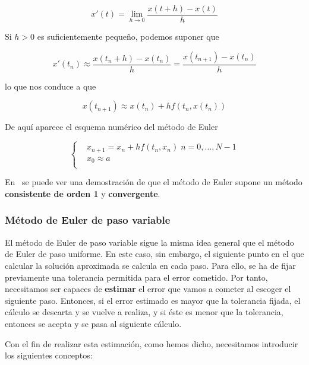 \begin{equation}
		x'(t) = \lim_{h \to 0} \frac{x(t+h) - x(t)}{h} 	
\end{equation}

Si $h>0$ es suficientemente pequeño, podemos suponer que

\begin{equation}
		x'(t_n)\approx \frac{x(t_n+h) - x(t_n)}{h} = \frac{x(t_{n+1}) -
		x(t_n)}{h}	
\end{equation}

lo que nos conduce a que

\begin{equation}
		x(t_{n+1}) \approx x(t_n) + hf(t_n,x(t_n))	
\end{equation}

De aquí aparece el esquema numérico del método de Euler

\begin{equation}
		\left\{ \begin{aligned}
				& x_{n+1} = x_n + hf(t_n,x_n) \; n=0,\ldots,N-1 \\
				& x_0 \approx a \\
		\end{aligned} \right.
\end{equation}

En~\citet{ANNU} se puede ver una demostración de que el método de Euler supone
un método \textbf{consistente de orden 1} y \textbf{convergente}.

\subsubsection{Método de Euler de paso variable}
\label{makereference5.4.3.2}

El método de Euler de paso variable sigue la misma idea general que el método de
Euler de paso uniforme. En este caso, sin embargo, el siguiente punto en el que
calcular la solución aproximada se calcula en cada paso. Para ello, se ha de
fijar previamente una tolerancia permitida para el error cometido. Por tanto,
necesitamos ser capaces de \textbf{estimar} el error que vamos a cometer al
escoger el siguiente paso. Entonces, si el error estimado es mayor que la
tolerancia fijada, el cálculo se descarta y se vuelve a realiza, y si éste es
menor que la tolerancia, entonces se acepta y se pasa al siguiente cálculo.

Con el fin de realizar esta estimación, como hemos dicho, necesitamos introducir
los siguientes conceptos:

